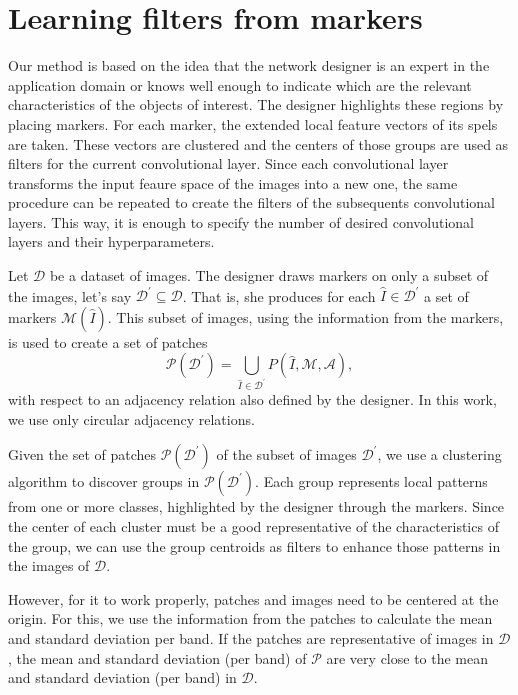 \documentclass[a4paper,conference]{IEEEtran}
\newcommand{\A}{\mathcal{A}}
\newcommand{\D}{\mathcal{D}}
\newcommand{\I}{\hat{I}}
\newcommand{\M}{\mathcal{M}}
\newcommand{\Pa}{\mathcal{P}}
\newcommand{\pDD}{\D^\prime}
\begin{document}
\section{Learning filters from markers}
Our method is based on the idea that the network designer is an expert in the application domain or knows well enough to indicate which are the relevant characteristics of the objects of interest. The designer highlights these regions by placing markers. For each marker, the extended local feature vectors of its spels are taken. These vectors are clustered and the centers of those groups are used as filters for the current convolutional layer. Since each convolutional layer transforms the input feaure space of the images into a new one, the same procedure can be repeated to create the filters of the subsequents convolutional layers. This way, it is enough to specify the number of desired convolutional layers and their hyperparameters. 

Let $\D$ be a dataset of images. The designer draws markers on only a subset of the images, let's say $\pDD \subseteq \D$. That is, she produces for each $\I \in \pDD$ a set of markers $\M(\I)$.  This subset of images, using the information from the markers, is used to create a set of patches \[\Pa(\pDD) = \bigcup_{\I \in \pDD}{P(\I, \M, \A)},\] with respect to an adjacency relation also defined by the designer. In this work, we use only circular adjacency relations.

Given the set of patches $\Pa(\pDD)$ of the subset of images $\pDD$, we use a clustering algorithm to discover groups in $\Pa(\pDD)$. Each group represents local patterns from one or more classes, highlighted by the designer through the markers. Since the center of each cluster must be a good representative of the characteristics of the group, we can use the group centroids as filters to enhance those patterns in the images of $\D$.

However, for it to work properly, patches and images need to be centered at the origin. For this, we use the information from the patches to calculate the mean and standard deviation per band. If the patches are representative of images in $\D$, the mean and standard deviation (per band) of $\Pa$ are very close to the mean and standard deviation (per band) in $\D$.
\end{document}
